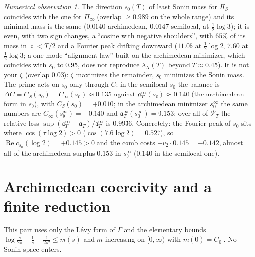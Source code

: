 \documentclass[11pt]{amsart}
\theoremstyle{definition}
\theoremstyle{remark}
\newtheorem{observation}[theorem]{Numerical observation}
\newcommand{\Rel}{\operatorname{Re}}
\newcommand{\PT}{\mathcal P_T}
\newcommand{\lamA}{\lambda_{\mathrm A}}
\begin{document}
\begin{observation}\label{obs:s0}
The direction $s_0(T)$ of least Sonin mass for $\Pi_S$ coincides with the one for $\Pi_\infty$ (overlap $\ge0.989$ on the whole
range) and its minimal mass is the same ($0.0140$ archimedean, $0.0147$ semilocal, at $\frac12\log3$); it is even, with two sign
changes, a ``cosine with negative shoulders'', with $65\%$ of its mass in $|t|<T/2$ and a Fourier peak drifting downward
($11.05$ at $\frac12\log2$, $7.60$ at $\frac12\log3$; a one-mode ``alignment law'' built on the archimedean minimizer, which coincides with $s_0$ to $0.95$, does not reproduce $\lamA(T)$ beyond $T\approx0.45$). It is not your $\zeta$ (overlap $0.03$): $\zeta$ maximizes the
remainder, $s_0$ minimizes the Sonin mass. The prime acts on $s_0$ only through $C$: in the semilocal $s_0$ the balance is $\Delta C=C_S(s_0)-C_\infty(s_0)\approx0.135$ against $\mathfrak a^\infty_T(s_0)\approx0.140$ (the archimedean form in $s_0$), with $C_S(s_0)=+0.010$; in the archimedean minimizer $s_0^\infty$ the same numbers are $C_\infty(s_0^\infty)=-0.140$ and $\mathfrak a^\infty_T(s_0^\infty)=0.153$; over all of $\PT$ the relative loss $\sup(\mathfrak a^\infty_T-\mathfrak a_T)/\mathfrak a^\infty_T$ is
$0.9936$. Concretely: the Fourier peak of $s_0$ sits where $\cos(\tau\log2)>0$ ($\cos(7.6\log2)=0.527$), so
$\Rel c_{s_0}(\log2)=+0.145>0$ and the comb costs $-v_2\cdot0.145=-0.142$, almost all of the archimedean surplus $0.153$ in $s_0^\infty$ ($0.140$ in the semilocal one).
\end{observation}

\section{Archimedean coercivity and a finite reduction}\label{sec:coer}

This part uses only the L\'evy form of $\Gamma$ and the elementary bounds
$\log\frac s{2\pi}-\frac1s-\frac1{2s^2}\le m(s)$ and $m$ increasing on $[0,\infty)$ with $m(0)=C_0$
\cite[Lemma~4.1]{Paper47}. No Sonin space enters.
\end{document}
